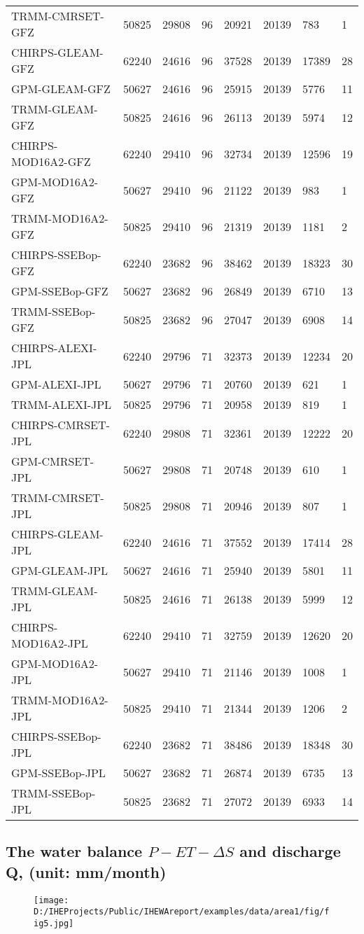 \documentclass[oneside,openany]{article}%
\begin{document}
\begin{longtable}{|l|l|l|l|l|l|l|l|}
TRMM-CMRSET-GFZ&50825&29808&96&20921&20139&783&1\\%
CHIRPS-GLEAM-GFZ&62240&24616&96&37528&20139&17389&28\\%
GPM-GLEAM-GFZ&50627&24616&96&25915&20139&5776&11\\%
TRMM-GLEAM-GFZ&50825&24616&96&26113&20139&5974&12\\%
CHIRPS-MOD16A2-GFZ&62240&29410&96&32734&20139&12596&19\\%
GPM-MOD16A2-GFZ&50627&29410&96&21122&20139&983&1\\%
TRMM-MOD16A2-GFZ&50825&29410&96&21319&20139&1181&2\\%
CHIRPS-SSEBop-GFZ&62240&23682&96&38462&20139&18323&30\\%
GPM-SSEBop-GFZ&50627&23682&96&26849&20139&6710&13\\%
TRMM-SSEBop-GFZ&50825&23682&96&27047&20139&6908&14\\%
CHIRPS-ALEXI-JPL&62240&29796&71&32373&20139&12234&20\\%
GPM-ALEXI-JPL&50627&29796&71&20760&20139&621&1\\%
TRMM-ALEXI-JPL&50825&29796&71&20958&20139&819&1\\%
CHIRPS-CMRSET-JPL&62240&29808&71&32361&20139&12222&20\\%
GPM-CMRSET-JPL&50627&29808&71&20748&20139&610&1\\%
TRMM-CMRSET-JPL&50825&29808&71&20946&20139&807&1\\%
CHIRPS-GLEAM-JPL&62240&24616&71&37552&20139&17414&28\\%
GPM-GLEAM-JPL&50627&24616&71&25940&20139&5801&11\\%
TRMM-GLEAM-JPL&50825&24616&71&26138&20139&5999&12\\%
CHIRPS-MOD16A2-JPL&62240&29410&71&32759&20139&12620&20\\%
GPM-MOD16A2-JPL&50627&29410&71&21146&20139&1008&1\\%
TRMM-MOD16A2-JPL&50825&29410&71&21344&20139&1206&2\\%
CHIRPS-SSEBop-JPL&62240&23682&71&38486&20139&18348&30\\%
GPM-SSEBop-JPL&50627&23682&71&26874&20139&6735&13\\%
TRMM-SSEBop-JPL&50825&23682&71&27072&20139&6933&14\\%
\end{longtable}

%
\clearpage%
\cleardoublepage%
\subsection{The water balance $P-ET-\Delta S$ and discharge Q, (unit: mm/month)}%
\label{subsec:ThewaterbalanceP{-}ET{-}DeltaSanddischargeQ,(unitmm/month)}%


\begin{figure}[H]%
\centering%
\texttt{[image: D:/IHEProjects/Public/IHEWAreport/examples/data/area1/fig/fig5.jpg]}%
\label{figure:ann3}%
\end{figure}

%
\clearpage%
\cleardoublepage

%
\end{document}
